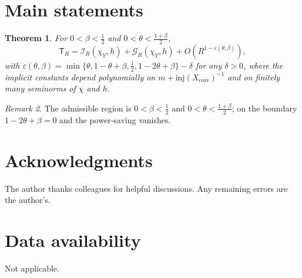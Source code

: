\documentclass[12pt]{amsart}
\numberwithin{equation}{section}
\theoremstyle{plain}
\newtheorem{theorem}{Theorem}[section]
\theoremstyle{definition}
\theoremstyle{remark}
\newtheorem{remark}[theorem]{Remark}
\newcommand{\injrad}{\mathrm{inj}}
\newcommand{\TR}{\mathsf{T}_R}
\begin{document}
\section{Main statements}
\begin{theorem}\label{thm:main}
For $0<\beta<\tfrac12$ and $0<\theta<\tfrac{1+\beta}{2}$,
\[
\TR = \mathcal{I}_R(\chi_Y,h)+\mathcal{G}_R(\chi_Y,h)+O(R^{1-\varepsilon(\theta,\beta)}),
\]
with $\varepsilon(\theta,\beta)=\min\{\theta,1-\theta+\beta,\tfrac12,1-2\theta+\beta\}-\delta$ for any $\delta>0$, where the implicit constants depend polynomially on $m+\injrad(X_{\mathrm{core}})^{-1}$ and on finitely many seminorms of $\chi$ and $h$.
\end{theorem}

\begin{remark}
The admissible region is $0<\beta<\tfrac12$ and $0<\theta<\tfrac{1+\beta}{2}$; on the boundary $1-2\theta+\beta=0$ and the power-saving vanishes.
\end{remark}

\section*{Acknowledgments}
The author thanks colleagues for helpful discussions. Any remaining errors are the author's.

\section*{Data availability}
Not applicable.
\end{document}

